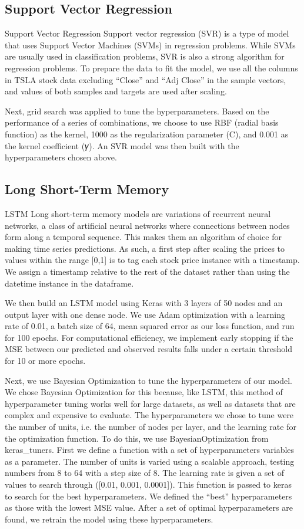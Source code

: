 \documentclass[12pt,a4paper]{article}
\begin{document}
\subsection{Support Vector Regression}
Support Vector Regression
Support vector regression (SVR) is a type of model that uses Support Vector Machines (SVMs) in regression problems. While SVMs are usually used in classification problems, SVR is also a strong algorithm for regression problems. To prepare the data to fit the model, we use all the columns in TSLA stock data excluding “Close” and “Adj Close” in the sample vectors, and values of both samples and targets are used after scaling. 

Next, grid search was applied to tune the hyperparameters. Based on the performance of a series of combinations, we choose to use RBF (radial basis function) as the kernel, 1000 as the regularization parameter (C), and 0.001 as the kernel coefficient (𝛾). An SVR model was then built with the hyperparameters chosen above. 


\subsection{Long Short-Term Memory}
LSTM
Long short-term memory models are variations of recurrent neural networks, a class of artificial neural networks where connections between nodes form along a temporal sequence. This makes them an algorithm of choice for making time series predictions. As such, a first step after scaling the prices to values within the range [0,1] is to tag each stock price instance with a timestamp. We assign a timestamp relative to the rest of the dataset rather than using the datetime instance in the dataframe.

We then build an LSTM model using Keras with 3 layers of 50 nodes and an output layer with one dense node. We use Adam optimization with a learning rate of 0.01, a batch size of 64, mean squared error as our loss function, and run for 100 epochs. For computational efficiency, we implement early stopping if the MSE between our predicted and observed results falls under a certain threshold for 10 or more epochs.

Next, we use Bayesian Optimization to tune the hyperparameters of our model. We chose Bayesian Optimization for this because, like LSTM, this method of hyperparameter tuning works well for large datasets, as well as datasets that are complex and expensive to evaluate. The hyperparameters we chose to tune were the number of units, i.e. the number of nodes per layer, and the learning rate for the optimization function. To do this, we use BayesianOptimization from keras_tuners. First we define a function with a set of hyperparameters variables as a parameter. The number of units is varied using a scalable approach, testing numbers from 8 to 64 with a step size of 8. The learning rate is given a set of values to search through ([0.01, 0.001, 0.0001]). This function is passed to keras to search for the best hyperparameters. We defined the “best” hyperparameters as those with the lowest MSE value. After a set of optimal hyperparameters are found, we retrain the model using these hyperparameters. 
\end{document}
